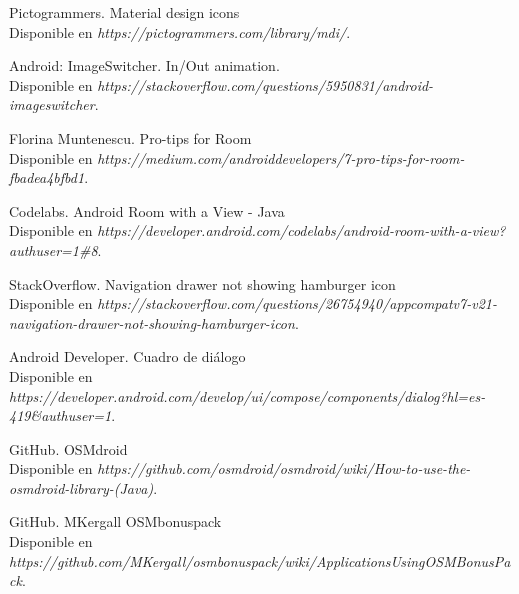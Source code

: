 \documentclass[11pt,a4paper]{article}
\begin{document}

%
%
\begin{thebibliography}{}

	\bibitem{}
    Pictogrammers.
	\newblock Material design icons \\
	\newblock Disponible en \textit{https://pictogrammers.com/library/mdi/}.  
    
    \bibitem{}
    Android: ImageSwitcher.
	\newblock In/Out animation. \\
	\newblock Disponible en \textit{https://stackoverflow.com/questions/5950831/android-imageswitcher}.  
    
    \bibitem{}
    Florina Muntenescu.
	 Pro-tips for Room \\
	\newblock Disponible en \textit{https://medium.com/androiddevelopers/7-pro-tips-for-room-fbadea4bfbd1}.

    \bibitem{}
    Codelabs.
	\newblock Android Room with a View - Java \\
	\newblock Disponible en \textit{https://developer.android.com/codelabs/android-room-with-a-view?authuser=1\#8}.

    \bibitem{}
    StackOverflow.
	\newblock Navigation drawer not showing hamburger icon \\
	\newblock Disponible en \textit{https://stackoverflow.com/questions/26754940/appcompatv7-v21-navigation-drawer-not-showing-hamburger-icon}.

    \bibitem{}
    Android Developer.
	\newblock Cuadro de diálogo \\
	\newblock Disponible en \textit{https://developer.android.com/develop/ui/compose/components/dialog?hl=es-419\&authuser=1}.

    \bibitem{}
    GitHub.
	\newblock OSMdroid \\
	\newblock Disponible en \textit{https://github.com/osmdroid/osmdroid/wiki/How-to-use-the-osmdroid-library-(Java)}.

    \bibitem{}
    GitHub.
	\newblock MKergall OSMbonuspack \\
	\newblock Disponible en \textit{https://github.com/MKergall/osmbonuspack/wiki/ApplicationsUsingOSMBonusPack}.
    

\end{thebibliography}
\end{document}
